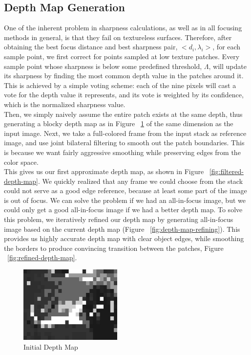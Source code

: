 \documentclass[annual]{acmsiggraph}
\begin{document}
\subsection{Depth Map Generation}
\label{sec:depthmap-generation}
One of the inherent problem in sharpness calculations, as well as in all focusing methods in general, is that they fail on textureless surfaces.  Therefore, after obtaining the best focus distance and best sharpness pair, $<d_i, \lambda_i>$, for each sample point, we first correct for points sampled at low texture patches.  Every sample point whose sharpness is below some predefined threshold, $\Lambda$, will update its sharpness by finding the most common depth value in the patches around it.  This is achieved by a simple voting scheme: each of the nine pixels will cast a vote for the depth value it represents, and its vote is weighted by its confidence, which is the normalized sharpness value. \\

Then, we simply naively assume the entire patch exists at the same depth, thus generating a blocky depth map as in Figure ~\ref{fig:initial-depth-map} of the same dimension as the input image. Next, we take a full-colored frame from the input stack as reference image, and use joint bilateral filtering to smooth out the patch boundaries.  This is because we want fairly aggressive smoothing while preserving edges from the color space. \\
This gives us our first approximate depth map, as shown in Figure ~\ref{fig:filtered-depth-map}.  We quickly realized that any frame we could choose from the stack could not serve as a good edge reference, because at least some part of the image is out of focus.  We can solve the problem if we had an all-in-focus image, but we could only get a good all-in-focus image if we had a better depth map.  To solve this problem, we iteratively refined our depth map by generating all-in-focus image based on the current depth map (Figure ~\ref{fig:depth-map-refining}).  This provides us highly accurate depth map with clear object edges, while smoothing the borders to produce convincing transition between the patches, Figure ~\ref{fig:refined-depth-map}.
\begin{figure}
\centering
\includegraphics[height=1.5in]{images/initial-depth-map.jpg}
\caption{Initial Depth Map}
\label{fig:initial-depth-map}
\end{figure}
\end{document}
